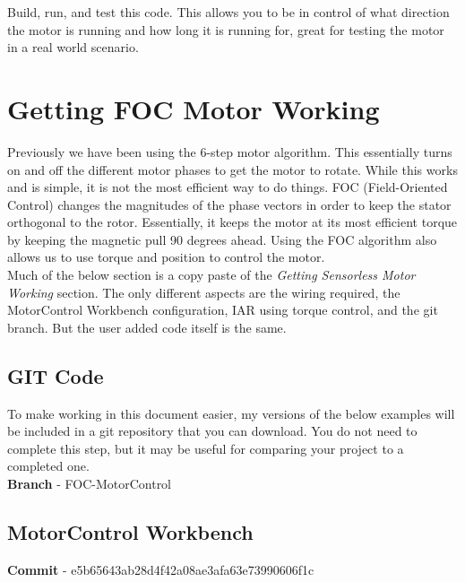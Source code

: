 \documentclass[10pt]{article}
\begin{document}
                    Build, run, and test this code. This allows you to be in control of what direction the motor is running and how long it is running for, great for testing the motor in a real world scenario.
	\FloatBarrier \section{Getting FOC Motor Working}
        Previously we have been using the 6-step motor algorithm. This essentially turns on and off the different motor phases to get the motor to rotate. While this works and is simple, it is not the most efficient way to do things. FOC (Field-Oriented Control) changes the magnitudes of the phase vectors in order to keep the stator orthogonal to the rotor. Essentially, it keeps the motor at its most efficient torque by keeping the magnetic pull 90 degrees ahead. Using the FOC algorithm also allows us to use torque and position to control the motor.\\
        Much of the below section is a copy paste of the \emph{Getting Sensorless Motor Working} section. The only different aspects are the wiring required, the MotorControl Workbench configuration, IAR using torque control, and the git branch. But the user added code itself is the same.
		\FloatBarrier \subsection{GIT Code}
            To make working in this document easier, my versions of the below examples will be included in a git repository that you can download. You do not need to complete this step, but it may be useful for comparing your project to a completed one. \\
            \textbf{Branch} - FOC-MotorControl
		\FloatBarrier \subsection{MotorControl Workbench}
            \textbf{Commit} - e5b65643ab28d4f42a08ae3afa63e73990606f1c \\
\end{document}
